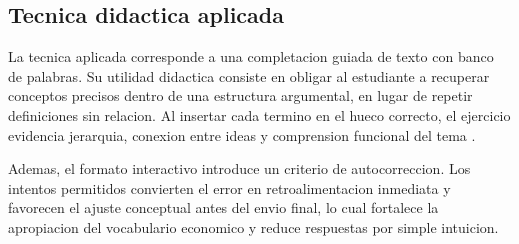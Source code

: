 \documentclass[
	spanish,
	letterpaper, oneside
]{article}
\newcommand{\pendiente}[1]{\textcolor{red}{[PENDIENTE: #1]}}
\begin{document}
\subsection{Tecnica didactica aplicada}

La tecnica aplicada corresponde a una completacion guiada de texto con banco de palabras. Su utilidad didactica consiste en obligar al estudiante a recuperar conceptos precisos dentro de una estructura argumental, en lugar de repetir definiciones sin relacion. Al insertar cada termino en el hueco correcto, el ejercicio evidencia jerarquia, conexion entre ideas y comprension funcional del tema \citep{unadm100TecnicasDidacticas2023}.

Ademas, el formato interactivo introduce un criterio de autocorreccion. Los intentos permitidos convierten el error en retroalimentacion inmediata y favorecen el ajuste conceptual antes del envio final, lo cual fortalece la apropiacion del vocabulario economico y reduce respuestas por simple intuicion.

%
\end{document}
